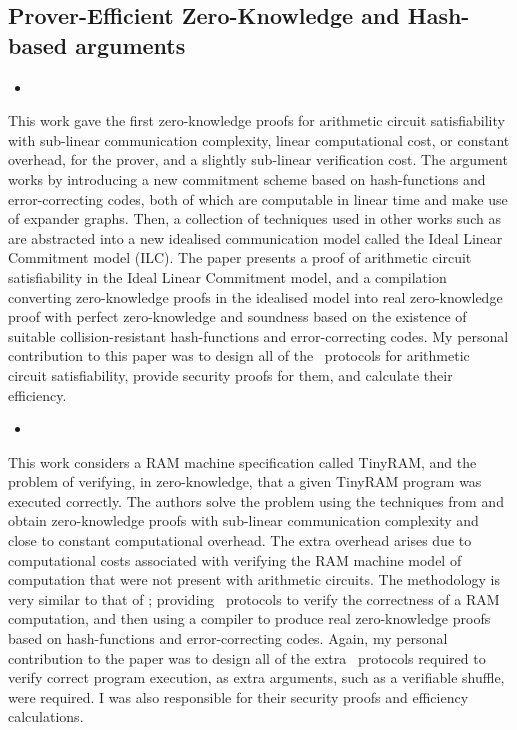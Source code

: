 \subsection*{Prover-Efficient Zero-Knowledge and Hash-based arguments}

\begin{itemize}
\item {}
\end{itemize}

This work gave the first zero-knowledge proofs for arithmetic circuit satisfiability with sub-linear communication complexity, linear computational cost, or constant overhead, for the prover, and a slightly sub-linear verification cost. The argument works by introducing a new commitment scheme based on hash-functions and error-correcting codes, both of which are computable in linear time and make use of expander graphs. Then, a collection of techniques used in other works such as \cite{Groth2009b} are abstracted into a new idealised communication model called the Ideal Linear Commitment model (ILC). The paper presents a proof of arithmetic circuit satisfiability in the Ideal Linear Commitment model, and a compilation converting zero-knowledge proofs in the idealised model into real zero-knowledge proof with perfect zero-knowledge and soundness based on the existence of suitable collision-resistant hash-functions and error-correcting codes. My personal contribution to this paper was to design all of the \ILC\ protocols for arithmetic circuit satisfiability, provide security proofs for them, and calculate their efficiency.

\begin{itemize}
\item {}
\end{itemize}

This work considers a RAM machine specification called TinyRAM, and the problem of verifying, in zero-knowledge, that a given TinyRAM program was executed correctly. The authors solve the problem using the techniques from \cite{BootleCGGHJ17} and obtain zero-knowledge proofs with sub-linear communication complexity and close to constant computational overhead. The extra overhead arises due to computational costs associated with verifying the RAM machine model of computation that were not present with arithmetic circuits. The methodology is very similar to that of \cite{BootleCGGHJ17}; providing \ILC\ protocols to verify the correctness of a RAM computation, and then using a compiler to produce real zero-knowledge proofs based on hash-functions and error-correcting codes. Again, my personal contribution to the paper was to design all of the extra \ILC\ protocols required to verify correct program execution, as extra arguments, such as a verifiable shuffle, were required. I was also responsible for their security proofs and efficiency calculations.

